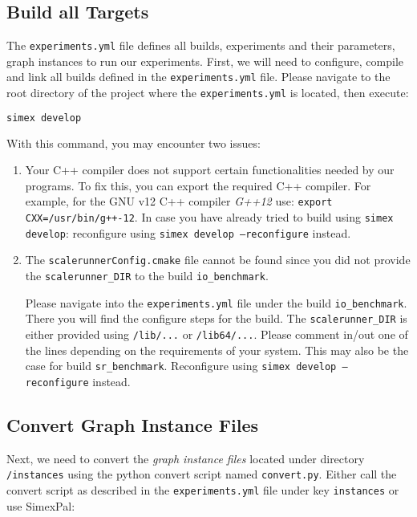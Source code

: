 \documentclass[11pt, a4paper]{scrartcl}
\newcommand{\expfile}{\texttt{experiments.yml} file\xspace}
\begin{document}
\subsection{Build all Targets}

The \texttt{experiments.yml} file defines all builds, experiments and their
parameters, graph instances to run our experiments. First, we will need to
configure, compile and link all builds defined in the \expfile. Please navigate
to the root directory of the project where the \texttt{experiments.yml} is
located, then execute:

\begin{lstlisting}[language=bash]
simex develop
\end{lstlisting}

With this command, you may encounter two issues:

\begin{enumerate}
    \item Your C++ compiler does not support certain functionalities needed by
    our programs. To fix this, you can export the required C++ compiler. For
    example, for the GNU v12 C++ compiler \textit{G++12} use: \texttt{export
    CXX=/usr/bin/g++-12}. In case you have already tried to build using
    \texttt{simex develop}: reconfigure using \texttt{simex develop
    --reconfigure} instead.
    \item The \texttt{scalerunnerConfig.cmake} file cannot be found since you
       did not provide the \texttt{scalerunner\_DIR} to the build \texttt{io\_benchmark}.
       
       Please navigate into the \texttt{experiments.yml} file under the build
       \texttt{io\_benchmark}. There you will find the configure steps for the build.
       The \texttt{scalerunner\_DIR} is either provided using \texttt{/lib/...} or
       \texttt{/lib64/...}. Please comment in/out one of the lines depending on the
       requirements of your system. This may also be the case for build
       \texttt{sr\_benchmark}. Reconfigure using \texttt{simex develop --reconfigure} instead.
\end{enumerate}

\subsection{Convert Graph Instance Files}

Next, we need to convert the \textit{graph instance files} located under
directory \texttt{/instances} using the python convert script named
\texttt{convert.py}. Either call the convert script as described in the \expfile
under key \texttt{instances} or use SimexPal:
\end{document}
